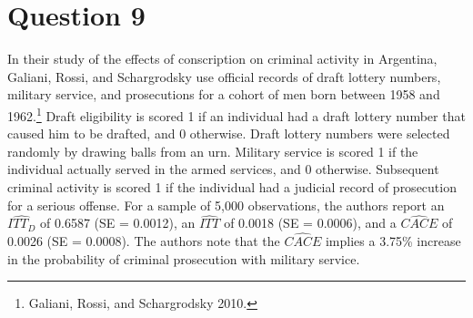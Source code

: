\documentclass[11pt,notitlepage]{article}\usepackage[]{graphicx}\usepackage[]{color}
\begin{document}
\section*{Question 9}
In their study of the effects of conscription on criminal activity in Argentina, Galiani, Rossi, and Schargrodsky use official records of draft lottery numbers, military service, and prosecutions for a cohort of men born between 1958 and 1962.\footnote{Galiani, Rossi, and Schargrodsky 2010.} Draft eligibility is scored 1 if an individual had a draft lottery number that caused him to be drafted, and 0 otherwise. Draft lottery numbers were selected randomly by drawing balls from an urn. Military service is scored 1 if the individual actually served in the armed services, and 0 otherwise. Subsequent criminal activity is scored 1 if the individual had a judicial record of prosecution for a serious offense. For a sample of 5,000 observations, the authors report an $\widehat{ITT_D}$ of 0.6587 (SE = 0.0012), an $\widehat{ITT}$ of 0.0018 (SE = 0.0006), and a $\widehat{CACE}$ of 0.0026 (SE = 0.0008). The authors note that the $\widehat{CACE}$ implies a 3.75\% increase in the probability of criminal prosecution with military service.
\end{document}

